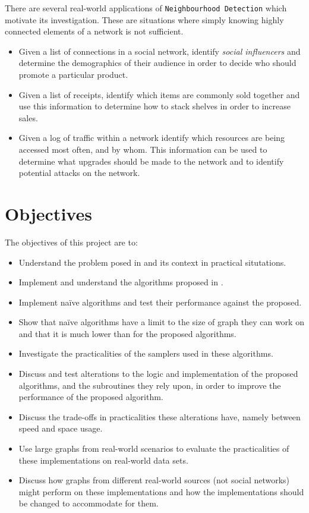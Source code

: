 \documentclass[11pt,twoside,a4paper]{report}
\begin{document}
There are several real-world applications of \texttt{Neighbourhood Detection} which motivate its investigation. These are situations where simply knowing highly connected elements of a network is not sufficient.
\begin{itemize}
	\item Given a list of connections in a social network, identify \textit{social influencers} and determine the demographics of their audience in order to decide who should promote a particular product.
	\item Given a list of receipts, identify which items are commonly sold together and use this information to determine how to stack shelves in order to increase sales.
	\item Given a log of traffic within a network identify which resources are being accessed most often, and by whom. This information can be used to determine what upgrades should be made to the network and to identify potential attacks on the network.
\end{itemize}

\section{Objectives}
The objectives of this project are to:
\begin{itemize}
  \item Understand the problem posed in \cite{orig} and its context in practical situtations.
	\item Implement and understand the algorithms proposed in \cite{orig}.
  \item Implement na\"ive algorithms and test their performance against the proposed.
  \item Show that na\"ive algorithms have a limit to the size of graph they can work on and that it is much lower than for the proposed algorithms.
  \item Investigate the practicalities of the samplers used in these algorithms.
  \item Discuss and test alterations to the logic and implementation of the proposed algorithms, and the subroutines they rely upon, in order to improve the performance of the proposed algorithm.
  \item Discuss the trade-offs in practicalities these alterations have, namely between speed and space usage.
	\item Use large graphs from real-world scenarios to evaluate the practicalities of these implementations on real-world data sets.
  \item Discuss how graphs from different real-world sources (\ie not social networks) might perform on these implementations and how the implementations should be changed to accommodate for them.
\end{itemize}
\end{document}
